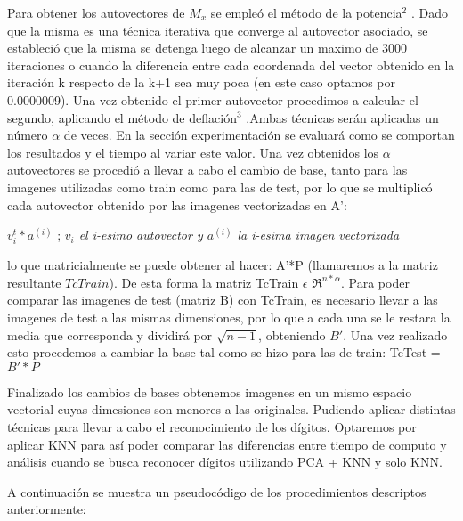  Para obtener los autovectores de $M_x$ se empleó el método de la potencia$^{2}$ %
. Dado que la misma es una técnica iterativa que converge al autovector asociado, se estableció que la misma se detenga luego de alcanzar un maximo de 3000 iteraciones o cuando la diferencia entre cada coordenada del vector obtenido en la iteración k respecto de la k+1 sea muy poca (en este caso optamos por 0.0000009). Una vez obtenido el primer autovector procedimos a calcular el segundo, aplicando el método de deflación$^{3}$ %
.Ambas técnicas serán aplicadas un número $\alpha$ de veces. En la sección experimentación se evaluará como se comportan los resultados y el tiempo al variar este valor.
Una vez obtenidos los $\alpha$ autovectores se procedió a llevar a cabo el cambio de base, tanto para las imagenes utilizadas como train como para las de test, por lo que se multiplicó cada autovector obtenido por las imagenes vectorizadas en A': \newline

$v_i^{t}*a^{(i)}$ ; \textit{$v_i$ el i-esimo autovector y $a^{(i)}$ la i-esima imagen vectorizada} \newline

lo que matricialmente se puede obtener al hacer: A'*P (llamaremos a la matriz resultante $TcTrain$). De esta forma la matriz TcTrain $\epsilon$ $\Re^{n*\alpha}$. Para poder comparar las imagenes de test (matriz B) con TcTrain, es necesario llevar a las imagenes de test a las mismas dimensiones, por lo que a cada una se le restara la media que corresponda y dividirá por $\sqrt{n-1}$, obteniendo $ B'$. 
Una vez realizado esto procedemos a cambiar la base tal como se hizo para las de train:\newline
 TcTest = $B'*P$

 Finalizado los cambios de bases obtenemos imagenes en un mismo espacio vectorial cuyas dimesiones son menores a las originales. Pudiendo aplicar distintas técnicas para llevar a cabo el reconocimiento de los dígitos. Optaremos por aplicar KNN para así poder comparar las diferencias entre tiempo de computo y análisis cuando se busca reconocer dígitos utilizando PCA + KNN y solo KNN.
 
A continuación se muestra un pseudocódigo de los procedimientos descriptos anteriormente:

